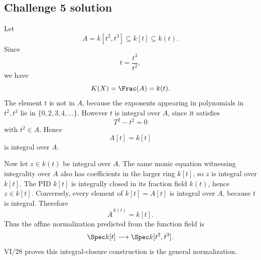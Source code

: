 \subsection*{Challenge 5 solution}
\begin{solution}
Let
\[
A=k[t^2,t^3]\subseteq k[t]\subseteq k(t).
\]
Since
\[
t=\frac{t^3}{t^2},
\]
we have
\[
K(X)=\Frac(A)=k(t).
\]
The element \(t\) is not in \(A\), because the exponents appearing in polynomials in \(t^2,t^3\) lie in
\(\{0,2,3,4,\ldots\}\). However \(t\) is integral over \(A\), since it satisfies
\[
T^2-t^2=0
\]
with \(t^2\in A\). Hence
\[
A[t]=k[t]
\]
is integral over \(A\).

Now let \(z\in k(t)\) be integral over \(A\). The same monic equation witnessing integrality over \(A\) also has
coefficients in the larger ring \(k[t]\), so \(z\) is integral over \(k[t]\). The PID \(k[t]\) is integrally
closed in its fraction field \(k(t)\), hence \(z\in k[t]\). Conversely, every element of \(k[t]=A[t]\) is integral
over \(A\), because \(t\) is integral. Therefore
\[
\boxed{
\overline A^{\,k(t)}=k[t].
}
\]
Thus the affine normalization predicted from the function field is
\[
\Spec k[t]\longrightarrow\Spec k[t^2,t^3].
\]
VI/28 proves this integral-closure construction is the general normalization.
\end{solution}
